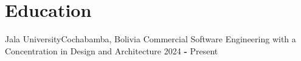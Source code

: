 \section*{Education}
\resumeSubHeadingListStart

\resumeSubheading
{Jala University}{Cochabamba, Bolivia}
{Commercial Software Engineering with a Concentration in Design and Architecture}
{2024 \textbf{-} Present}


\resumeSubHeadingListEnd